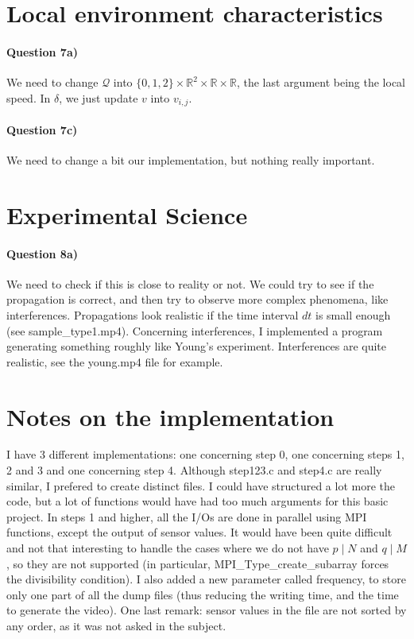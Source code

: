\documentclass[a4paper,12pt]{article}
\begin{document}
\section{Local environment characteristics}

\paragraph{Question 7a)} We need to change $\mathcal{Q}$ into $\{0,1,2\} \times \mathbb{R}^2 \times \mathbb{R} \times \mathbb{R}$, the last argument being the local speed. In $\delta$, we just update $v$ into $v_{i,j}$.

\paragraph{Question 7c)} We need to change a bit our implementation, but nothing really important. 

\section{Experimental Science}

\paragraph{Question 8a)} We need to check if this is close to reality or not. We could try to see if the propagation is correct, and then try to observe more complex phenomena, like interferences. Propagations look realistic if the time interval $dt$ is small enough (see sample\_type1.mp4). Concerning interferences, I implemented a program generating something roughly like Young's experiment. Interferences are quite realistic, see the young.mp4 file for example.

\section{Notes on the implementation}

I have 3 different implementations: one concerning step 0, one concerning steps 1, 2 and 3 and one concerning step 4. Although step123.c and step4.c are really similar, I prefered to create distinct files. I could have structured a lot more the code, but a lot of functions would have had too much arguments for this basic project. In steps 1 and higher, all the I/Os are done in parallel using MPI functions, except the output of sensor values. It would have been quite difficult and not that interesting to handle the cases where we do not have $p \mid N$ and $q \mid M$, so they are not supported (in particular, MPI\_Type\_create\_subarray forces the divisibility condition). I also added a new parameter called frequency, to store only one part of all the dump files (thus reducing the writing time, and the time to generate the video). One last remark: sensor values in the file are not sorted by any order, as it was not asked in the subject.
\end{document}
